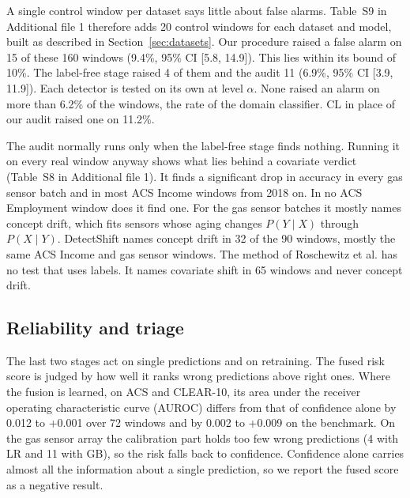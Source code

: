 \documentclass[pdflatex,referee,lineno,sn-basic]{sn-jnl}
\begin{document}
A single control window per dataset says little about false alarms. Table~S9 in Additional file 1 therefore adds 20 control windows for each dataset and model, built as described in Section~\ref{sec:datasets}. Our procedure raised a false alarm on 15 of these 160 windows (9.4\%, 95\% CI [5.8, 14.9]). This lies within its bound of 10\%. The label-free stage raised 4 of them and the audit 11 (6.9\%, 95\% CI [3.9, 11.9]). Each detector is tested on its own at level $\alpha$. None raised an alarm on more than 6.2\% of the windows, the rate of the domain classifier. CL in place of our audit raised one on 11.2\%.

The audit normally runs only when the label-free stage finds nothing. Running it on every real window anyway shows what lies behind a covariate verdict (Table~S8 in Additional file 1). It finds a significant drop in accuracy in every gas sensor batch and in most ACS Income windows from 2018 on. In no ACS Employment window does it find one. For the gas sensor batches it mostly names concept drift, which fits sensors whose aging changes $P(Y\mid X)$ through $P(X\mid Y)$. DetectShift names concept drift in 32 of the 90 windows, mostly the same ACS Income and gas sensor windows. The method of Roschewitz et al. has no test that uses labels. It names covariate shift in 65 windows and never concept drift.

\subsection{Reliability and triage}\label{sec:res-reliability}

The last two stages act on single predictions and on retraining. The fused risk score is judged by how well it ranks wrong predictions above right ones. Where the fusion is learned, on ACS and CLEAR-10, its area under the receiver operating characteristic curve (AUROC) differs from that of confidence alone by \textminus{}0.012 to +0.001 over 72 windows and by \textminus{}0.002 to +0.009 on the benchmark. On the gas sensor array the calibration part holds too few wrong predictions (4 with LR and 11 with GB), so the risk falls back to confidence. Confidence alone carries almost all the information about a single prediction, so we report the fused score as a negative result.
\end{document}
